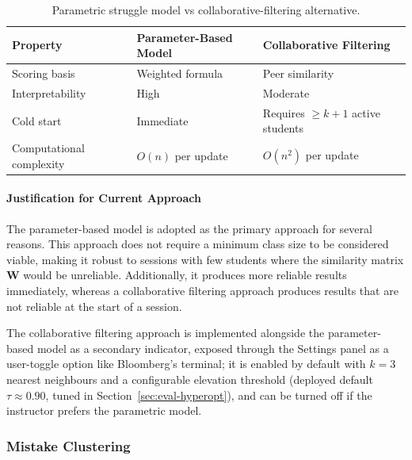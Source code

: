 \begin{table}[H]
    \centering
    \begin{tabular}{|p{}|p{}|p{}|}
    \hline
    \textbf{Property} & \textbf{Parameter-Based Model} & \textbf{Collaborative Filtering} \\
    \hline
    Scoring basis & Weighted formula & Peer similarity \\
    \hline
    Interpretability & High & Moderate \\
    \hline
    Cold start & Immediate & Requires $\geq k+1$ active students \\

    \hline
    Computational complexity & $O(n)$ per update & $O(n^2)$ per update \\
    \hline
    \end{tabular}
    \caption{Parametric struggle model vs collaborative-filtering alternative.}
    \label{tab: model comparison}
\end{table}

\paragraph{Justification for Current Approach}
The parameter-based model is adopted as the primary approach for several reasons. This approach does not require a minimum class size to be considered viable, making it robust to sessions with few students where the similarity matrix $\mathbf{W}$ would be unreliable. Additionally, it produces more reliable results immediately, whereas a collaborative filtering approach produces results that are not reliable at the start of a session. 

The collaborative filtering approach is implemented alongside the parameter-based model as a secondary indicator, exposed through the Settings panel as a user-toggle option like Bloomberg's terminal; it is enabled by default with $k=3$ nearest neighbours and a configurable elevation threshold (deployed default $\tau \approx 0.90$, tuned in Section~\ref{sec:eval-hyperopt}), and can be turned off if the instructor prefers the parametric model.

\subsubsection{Mistake Clustering} \label{sec: mistake clustering}

